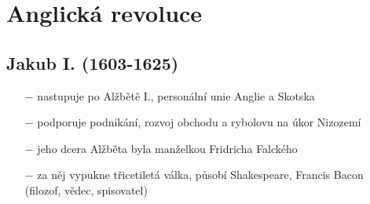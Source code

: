 \documentclass{article}
\begin{document}
\section*{Anglická revoluce}

\subsection*{Jakub I. (1603-1625)}
\begin{itemize}
    \vspace{-0.5em}
    \setlength\itemsep{0.15em}
    \item[$-$] nastupuje po Alžbětě I., personální unie Anglie a Skotska
    \item[$-$] podporuje podnikání, rozvoj obchodu a rybolovu na úkor Nizozemí
    \item[$-$] jeho dcera Alžběta byla manželkou Fridricha Falckého
    \item[$-$] za něj vypukne třicetiletá válka, působí Shakespeare, Francis Bacon (filozof, vědec, spisovatel)
\end{itemize}
\end{document}
